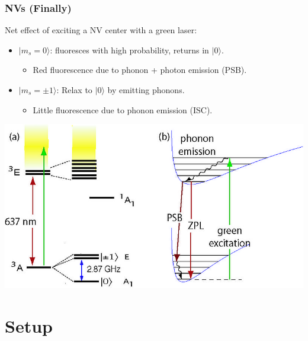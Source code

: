\documentclass{beamer}
\begin{document}
\begin{frame}
    \frametitle{NVs (Finally)} 
    Net effect of exciting a NV center with a green laser: 
    \begin{itemize}
        \item $|m_s=0\rangle$: fluoresces with high probability, returns in $|0\rangle$. 
        \begin{itemize}
            \item Red fluorescence due to phonon + photon emission (PSB). 
        \end{itemize}
        \item $|m_s=\pm 1\rangle$: Relax to $|0\rangle$ by emitting phonons. 
        \begin{itemize}
            \item Little fluorescence due to phonon emission (ISC). 
        \end{itemize}
    \end{itemize}
    \begin{minipage}{0.5\textwidth}
        \centering
        \includegraphics[width=\linewidth]{presentation/figs/Nv_structure.jpg} \\
        {\small }
    \end{minipage}
    
\end{frame}

\section{Setup}
\end{document}
